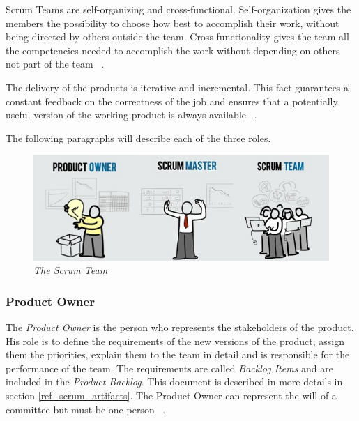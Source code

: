 		Scrum Teams are self-organizing and cross-functional. Self-organization gives the members the possibility to choose how best to accomplish their work, without being directed by others outside the team. Cross-functionality gives the team all the competencies needed to accomplish the work without depending on others not part of the team ~\cite{scrumEnglishGuide}. 

		The delivery of the products is iterative and incremental. This fact guarantees a constant feedback on the correctness of the job and ensures that a potentially useful version of the working product is always available ~\cite{scrumEnglishGuide}.

		The following paragraphs will describe each of the three roles.

		\begin{figure}[h]
		  \begin{center} 
		    \includegraphics[scale=0.75]{images/ch_04/scrum_team_final.jpg}
		  \end{center} 
		  \caption{\textit{The Scrum Team}}  
		  \label{fig:ScrumTeam}
	  	\end{figure}
			

			\subsubsection{Product Owner}\label{ref_prod_owner}
			The \emph{Product Owner} is the person who represents the stakeholders of the product. His role is to define the requirements of the new versions of the product, assign them the priorities, explain them to the team in detail and is responsible for the performance of the team. 
			The requirements are called \emph{Backlog Items} and are included in the \emph{Product Backlog}. This document is described in more details in section \ref{ref_scrum_artifacts}.
			The Product Owner can represent the will of a committee but must be one person ~\cite{scrumEnglishGuide}. 
			

